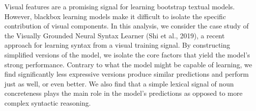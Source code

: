 Visual features are a promising signal for learning bootstrap textual models. However, blackbox learning models make it difficult to isolate the specific contribution of visual components. In this analysis, we consider the case study of the Visually Grounded Neural Syntax Learner (Shi et al., 2019), a recent approach for learning syntax from a visual training signal. By constructing simplified versions of the model, we isolate the core factors that yield the model's strong performance. Contrary to what the model might be capable of learning, we find significantly less expressive versions produce similar predictions and perform just as well, or even better. We also find that a simple lexical signal of noun concreteness plays the main role in the model's predictions as opposed to more complex syntactic reasoning.
